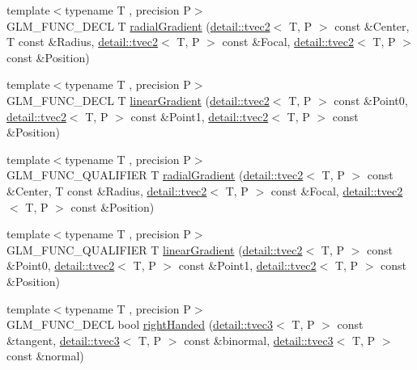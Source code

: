 \begin{DoxyCompactItemize}
\item 
{\footnotesize template$<$typename T , precision P$>$ }\\G\+L\+M\+\_\+\+F\+U\+N\+C\+\_\+\+D\+E\+CL T \hyperlink{group__gtx__gradient__paint_ga864c46234e363137b717119231f422f6}{radial\+Gradient} (\hyperlink{structglm_1_1detail_1_1tvec2}{detail\+::tvec2}$<$ T, P $>$ const \&Center, T const \&Radius, \hyperlink{structglm_1_1detail_1_1tvec2}{detail\+::tvec2}$<$ T, P $>$ const \&Focal, \hyperlink{structglm_1_1detail_1_1tvec2}{detail\+::tvec2}$<$ T, P $>$ const \&Position)
\item 
{\footnotesize template$<$typename T , precision P$>$ }\\G\+L\+M\+\_\+\+F\+U\+N\+C\+\_\+\+D\+E\+CL T \hyperlink{group__gtx__gradient__paint_ga01eb377864e98f86bd44378e1b86eb22}{linear\+Gradient} (\hyperlink{structglm_1_1detail_1_1tvec2}{detail\+::tvec2}$<$ T, P $>$ const \&Point0, \hyperlink{structglm_1_1detail_1_1tvec2}{detail\+::tvec2}$<$ T, P $>$ const \&Point1, \hyperlink{structglm_1_1detail_1_1tvec2}{detail\+::tvec2}$<$ T, P $>$ const \&Position)
\item 
{\footnotesize template$<$typename T , precision P$>$ }\\G\+L\+M\+\_\+\+F\+U\+N\+C\+\_\+\+Q\+U\+A\+L\+I\+F\+I\+ER T \hyperlink{group__gtx__gradient__paint_ga864c46234e363137b717119231f422f6}{radial\+Gradient} (\hyperlink{structglm_1_1detail_1_1tvec2}{detail\+::tvec2}$<$ T, P $>$ const \&Center, T const \&Radius, \hyperlink{structglm_1_1detail_1_1tvec2}{detail\+::tvec2}$<$ T, P $>$ const \&Focal, \hyperlink{structglm_1_1detail_1_1tvec2}{detail\+::tvec2}$<$ T, P $>$ const \&Position)
\item 
{\footnotesize template$<$typename T , precision P$>$ }\\G\+L\+M\+\_\+\+F\+U\+N\+C\+\_\+\+Q\+U\+A\+L\+I\+F\+I\+ER T \hyperlink{group__gtx__gradient__paint_ga01eb377864e98f86bd44378e1b86eb22}{linear\+Gradient} (\hyperlink{structglm_1_1detail_1_1tvec2}{detail\+::tvec2}$<$ T, P $>$ const \&Point0, \hyperlink{structglm_1_1detail_1_1tvec2}{detail\+::tvec2}$<$ T, P $>$ const \&Point1, \hyperlink{structglm_1_1detail_1_1tvec2}{detail\+::tvec2}$<$ T, P $>$ const \&Position)
\item 
{\footnotesize template$<$typename T , precision P$>$ }\\G\+L\+M\+\_\+\+F\+U\+N\+C\+\_\+\+D\+E\+CL bool \hyperlink{group__gtx__handed__coordinate__space_ga16517e8a56cba5ba908e6eac6500ab94}{right\+Handed} (\hyperlink{structglm_1_1detail_1_1tvec3}{detail\+::tvec3}$<$ T, P $>$ const \&tangent, \hyperlink{structglm_1_1detail_1_1tvec3}{detail\+::tvec3}$<$ T, P $>$ const \&binormal, \hyperlink{structglm_1_1detail_1_1tvec3}{detail\+::tvec3}$<$ T, P $>$ const \&normal)

\end{DoxyCompactItemize}
